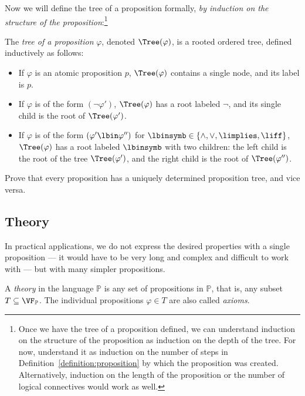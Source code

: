 Now we will define the tree of a proposition formally, \emph{by induction on the structure of the proposition}:\footnote{Once we have the tree of a proposition defined, we can understand induction on the structure of the proposition as induction on the depth of the tree. For now, understand it as induction on the number of steps in Definition~\ref{definition:proposition} by which the proposition was created. Alternatively, induction on the length of the proposition or the number of logical connectives would work as well.}

\begin{definition}
    The \emph{tree of a proposition} $\varphi$, denoted $\Tree(\varphi)$, is a rooted ordered tree, defined inductively as follows: 
    \begin{itemize}
        \item If $\varphi$ is an atomic proposition $p$, $\Tree(\varphi)$ contains a single node, and its label is $p$.
        \item If $\varphi$ is of the form $(\neg \varphi')$, $\Tree(\varphi)$ has a root labeled $\neg$, and its single child is the root of $\Tree(\varphi')$.
        \item If $\varphi$ is of the form $(\varphi' \lbin \varphi'')$ for $\lbinsymb \in \{\land, \lor, \limplies, \liff\}$, $\Tree(\varphi)$ has a root labeled $\lbinsymb$ with two children: the left child is the root of the tree $\Tree(\varphi')$, and the right child is the root of $\Tree(\varphi'')$.
    \end{itemize}
\end{definition}

\begin{exercise}
    Prove that every proposition has a uniquely determined proposition tree, and vice versa.
\end{exercise}

\subsection{Theory}

In practical applications, we do not express the desired properties with a single proposition — it would have to be very long and complex and difficult to work with — but with many simpler propositions.

\begin{definition}[Theory]\label{definition:theory}
    A \emph{theory} in the language $\mathbb P$ is any set of propositions in $\mathbb P$, that is, any subset $T \subseteq \VF_\mathbb P$. The individual propositions $\varphi \in T$ are also called \emph{axioms}.
\end{definition}


